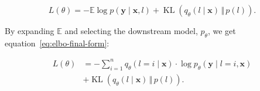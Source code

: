 \begin{equation}
\label{eq:elbo-pre-final-form}
    L(\theta)=-\mathbb{E} \log p(\boldsymbol{y} \mid \boldsymbol{x}, l) + \operatorname{KL}\left(q_\theta(l \mid \boldsymbol{x}) \, \Vert \, p(l)\right).
\end{equation}

By expanding $\mathbb{E}$ and selecting the downstream model, $p_\theta$, we get equation~\ref{eq:elbo-final-form}:

\begin{equation}
\begin{aligned}
\label{eq:elbo-final-form}
    L(\theta) &= -\sum_{i=1}^n q_\theta(l=i \mid \boldsymbol{x}) \cdot \log p_\theta(\boldsymbol{y} \mid l=i, \boldsymbol{x}) \\ 
    &+ \operatorname{KL}\left(q_\theta(l \mid \boldsymbol{x}) \, \Vert \, p(l)\right).
\end{aligned}
\end{equation}
